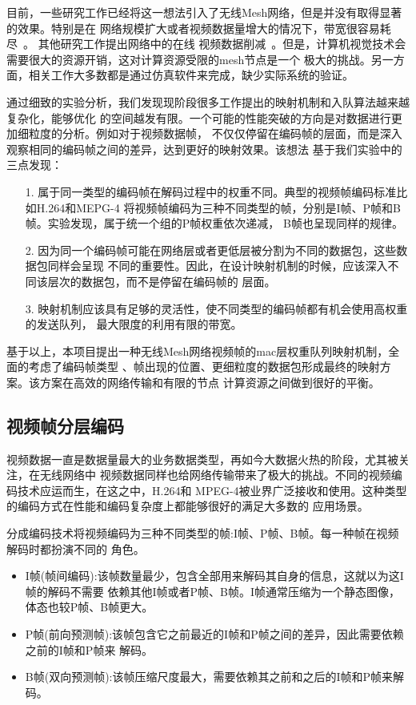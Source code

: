 目前，一些研究工作已经将这一想法引入了无线Mesh网络，但是并没有取得显著的效果。特别是在
网络规模扩大或者视频数据量增大的情况下，带宽很容易耗尽~\cite{Iptvhome}。
其他研究工作提出网络中的在线
视频数据削减~\cite{W4}。但是，计算机视觉技术会需要很大的资源开销，这对计算资源受限的mesh节点是一个
极大的挑战。另一方面，相关工作大多数都是通过仿真软件来完成，缺少实际系统的验证。

通过细致的实验分析，我们发现现阶段很多工作提出的映射机制和入队算法越来越复杂化，能够优化
的空间越发有限。一个可能的性能突破的方向是对数据进行更加细粒度的分析。例如对于视频数据帧，
不仅仅停留在编码帧的层面，而是深入观察相同的编码帧之间的差异，达到更好的映射效果。该想法
基于我们实验中的三点发现：
\begin{itemize}
\item[1.] 属于同一类型的编码帧在解码过程中的权重不同。典型的视频帧编码标准比如H.264和MEPG-4
将视频帧编码为三种不同类型的帧，分别是I帧、P帧和B帧。实验发现，属于统一个组的P帧权重依次递减，
B帧也呈现同样的规律。
\item[2.] 因为同一个编码帧可能在网络层或者更低层被分割为不同的数据包，这些数据包同样会呈现
不同的重要性。因此，在设计映射机制的时候，应该深入不同该层次的数据包，而不是停留在编码帧的
层面。
\item[3.] 映射机制应该具有足够的灵活性，使不同类型的编码帧都有机会使用高权重的发送队列，
最大限度的利用有限的带宽。
\end{itemize}

基于以上，本项目提出一种无线Mesh网络视频帧的mac层权重队列映射机制，全面的考虑了编码帧类型
、帧出现的位置、更细粒度的数据包形成最终的映射方案。该方案在高效的网络传输和有限的节点
计算资源之间做到很好的平衡。

\subsection{视频帧分层编码}
视频数据一直是数据量最大的业务数据类型，再如今大数据火热的阶段，尤其被关注，在无线网络中
视频数据同样也给网络传输带来了极大的挑战。不同的视频编码技术应运而生，在这之中，H.264和
MPEG-4被业界广泛接收和使用。这种类型的编码方式在性能和编码复杂度上都能够很好的满足大多数的
应用场景。

分成编码技术将视频编码为三种不同类型的帧:I帧、P帧、B帧。每一种帧在视频解码时都扮演不同的
角色。
\begin{itemize}
\item I帧(帧间编码):该帧数量最少，包含全部用来解码其自身的信息，这就以为这I帧的解码不需要
依赖其他I帧或者P帧、B帧。I帧通常压缩为一个静态图像，体态也较P帧、B帧更大。
\item P帧(前向预测帧):该帧包含它之前最近的I帧和P帧之间的差异，因此需要依赖之前的I帧和P帧来
解码。
\item B帧(双向预测帧):该帧压缩尺度最大，需要依赖其之前和之后的I帧和P帧来解码。
\end{itemize}

